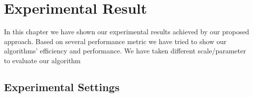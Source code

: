 \documentclass[a4paper,12pt]{book}
\begin{document}
\chapter{Experimental Result}
In this chapter we have shown our experimental results achieved by our proposed approach. Based on several performance metric we have tried to show our algorithms' efficiency and performance. We have taken different scale/parameter to evaluate our algorithm
\section{Experimental Settings}
\end{document}
